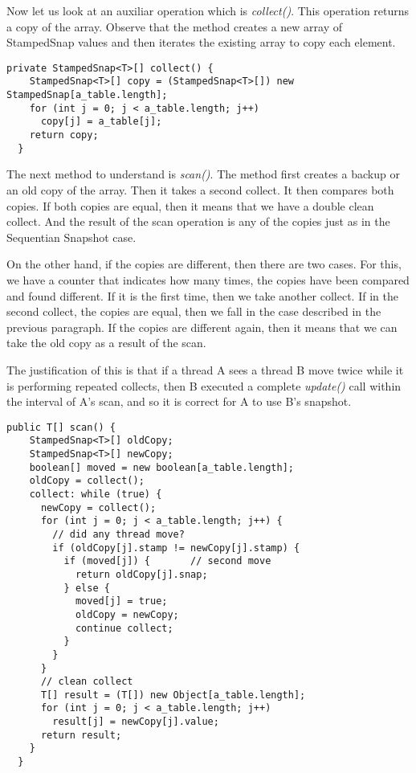 \par
Now let us look at an auxiliar operation which is \textit{collect()}. This
operation returns a copy of the array. Observe that the method creates a new
array of StampedSnap values and then iterates the existing array to copy each element.
\par
\hfill
\begin{lstlisting}[style=numbers]
  private StampedSnap<T>[] collect() {
    StampedSnap<T>[] copy = (StampedSnap<T>[]) new StampedSnap[a_table.length];
    for (int j = 0; j < a_table.length; j++)
      copy[j] = a_table[j];
    return copy;
  }
\end{lstlisting}
\hfill
\par
The next method to understand is \textit{scan()}. The method first creates a
backup or an old copy of the array. Then it takes a second collect. It then
compares both copies. If both copies are equal, then it means that we have a
double clean collect. And the result of the scan operation is any of the copies
just as in the Sequentian Snapshot case.
\par
On the other hand, if the copies are different, then there are two cases. For
this, we have a counter that indicates how many times, the copies have been
compared and found different. If it is the first time, then we take another
collect. If in the second collect, the copies are equal, then we fall in the
case described in the previous paragraph. If the copies are different again,
then it means that we can take the old copy as a result of the scan. 
\par
The justification of this is that if a thread A sees a thread B move twice while
it is performing repeated collects, then B executed a complete \textit{update()}
call within the interval of A's scan, and so it is correct for A to use B's
snapshot.
\par
\hfill
\begin{lstlisting}[style=numbers]
  public T[] scan() {
    StampedSnap<T>[] oldCopy;
    StampedSnap<T>[] newCopy;
    boolean[] moved = new boolean[a_table.length];
    oldCopy = collect();
    collect: while (true) {
      newCopy = collect();
      for (int j = 0; j < a_table.length; j++) {
        // did any thread move?
        if (oldCopy[j].stamp != newCopy[j].stamp) {
          if (moved[j]) {       // second move
            return oldCopy[j].snap;
          } else {
            moved[j] = true;
            oldCopy = newCopy;
            continue collect;
          }   
        }   
      }   
      // clean collect
      T[] result = (T[]) new Object[a_table.length];
      for (int j = 0; j < a_table.length; j++)
        result[j] = newCopy[j].value;
      return result;
    }   
  }
\end{lstlisting}
